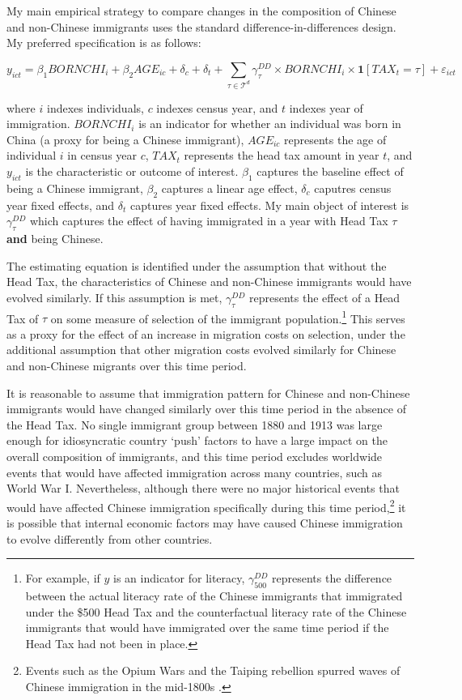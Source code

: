 My main empirical strategy to compare changes in the composition of Chinese and non-Chinese immigrants uses the standard difference-in-differences design. My preferred specification is as follows:

\begin{equation}
    \label{eq:did}
    y_{ict} = \beta_1 BORNCHI_i + \beta_2 AGE_{ic} + \delta_c + \delta_t + \sum_{\tau \in \mathcal{T}^d} \gamma_\tau^{DD} \times BORNCHI_i \times \mathbf{1}[TAX_t = \tau] + \varepsilon_{ict}
\end{equation}

where $i$ indexes individuals, $c$ indexes census year, and $t$ indexes year of immigration. 
$BORNCHI_i$ is an indicator for whether an individual was born in China (a proxy for being a Chinese immigrant), $AGE_{ic}$ represents the age of individual $i$ in census year $c$, $TAX_t$ represents the head tax amount in year $t$, and $y_{ict}$ is the characteristic or outcome of interest. $\beta_1$ captures the baseline effect of being a Chinese immigrant, $\beta_2$ captures a linear age effect, $\delta_c$ caputres census year fixed effects, and $\delta_t$ captures year fixed effects. My main object of interest is $\gamma_{\tau}^{DD}$ which captures the effect of having immigrated in a year with Head Tax $\tau$ \textbf{and} being Chinese.

The estimating equation is identified under the assumption that without the Head Tax, the characteristics of Chinese and non-Chinese immigrants would have evolved similarly. If this assumption is met, $\gamma_{\tau}^{DD}$ represents the effect of a Head Tax of $\tau$ on some measure of selection of the immigrant population.\footnote{For example, if $y$ is an indicator for literacy, $\gamma_{500}^{DD}$ represents the difference between the actual literacy rate of the Chinese immigrants that immigrated under the \$500 Head Tax and the counterfactual literacy rate of the Chinese immigrants that would have immigrated over the same time period if the Head Tax had not been in place.} This serves as a proxy for the effect of an increase in migration costs on selection, under the additional assumption that other migration costs evolved similarly for Chinese and non-Chinese migrants over this time period.

It is reasonable to assume that immigration pattern for Chinese and non-Chinese immigrants would have changed similarly over this time period in the absence of the Head Tax. No single immigrant group between 1880 and 1913 was large enough for idiosyncratic country `push' factors to have a large impact on the overall composition of immigrants, and this time period excludes worldwide events that would have affected immigration across many countries, such as World War I. Nevertheless, although there were no major historical events that would have affected Chinese immigration specifically during this time period,\footnote{Events such as the Opium Wars and the Taiping rebellion spurred waves of Chinese immigration in the mid-1800s \citep{mckeown2010}.} it is possible that internal economic factors may have caused Chinese immigration to evolve differently from other countries. 

